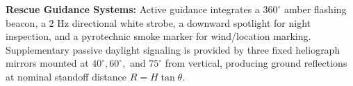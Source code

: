 \textbf{Rescue Guidance Systems:} Active guidance integrates a $360^\circ$ amber flashing beacon, a $2\text{ Hz}$ directional white strobe, a downward spotlight for night inspection, and a pyrotechnic smoke marker for wind/location marking. Supplementary passive daylight signaling is provided by three fixed heliograph mirrors mounted at $40^\circ, 60^\circ,$ and $75^\circ$ from vertical, producing ground reflections at nominal standoff distance $R = H \tan \theta$.
